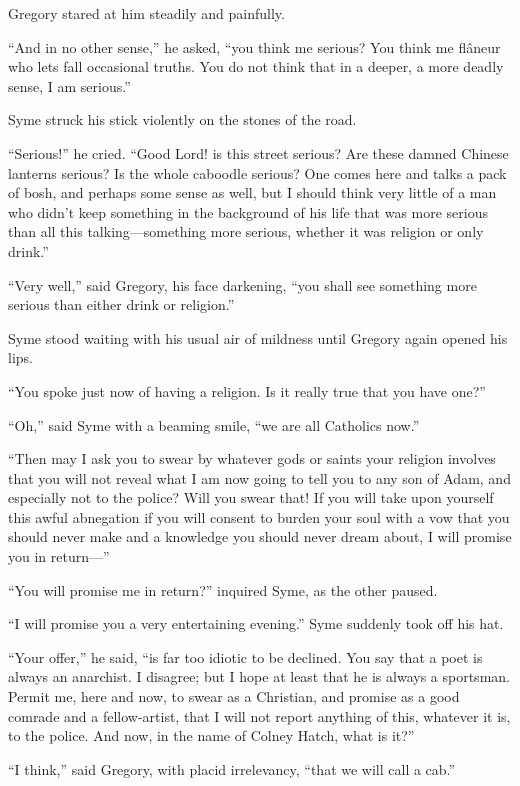 Gregory stared at him steadily and painfully.

“And in no other sense,” he asked, “you think me serious? You think me flâneur who lets fall occasional truths. You do not think that in a deeper, a more deadly sense, I am serious.”

Syme struck his stick violently on the stones of the road.

“Serious!” he cried. “Good Lord! is this street serious? Are these damned Chinese lanterns serious? Is the whole caboodle serious? One comes here and talks a pack of bosh, and perhaps some sense as well, but I should think very little of a man who didn’t keep something in the background of his life that was more serious than all this talking⁠—something more serious, whether it was religion or only drink.”

“Very well,” said Gregory, his face darkening, “you shall see something more serious than either drink or religion.”

Syme stood waiting with his usual air of mildness until Gregory again opened his lips.

“You spoke just now of having a religion. Is it really true that you have one?”

“Oh,” said Syme with a beaming smile, “we are all Catholics now.”

“Then may I ask you to swear by whatever gods or saints your religion involves that you will not reveal what I am now going to tell you to any son of Adam, and especially not to the police? Will you swear that! If you will take upon yourself this awful abnegation if you will consent to burden your soul with a vow that you should never make and a knowledge you should never dream about, I will promise you in return⁠—”

“You will promise me in return?” inquired Syme, as the other paused.

“I will promise you a very entertaining evening.” Syme suddenly took off his hat.

“Your offer,” he said, “is far too idiotic to be declined. You say that a poet is always an anarchist. I disagree; but I hope at least that he is always a sportsman. Permit me, here and now, to swear as a Christian, and promise as a good comrade and a fellow-artist, that I will not report anything of this, whatever it is, to the police. And now, in the name of Colney Hatch, what is it?”

“I think,” said Gregory, with placid irrelevancy, “that we will call a cab.”

